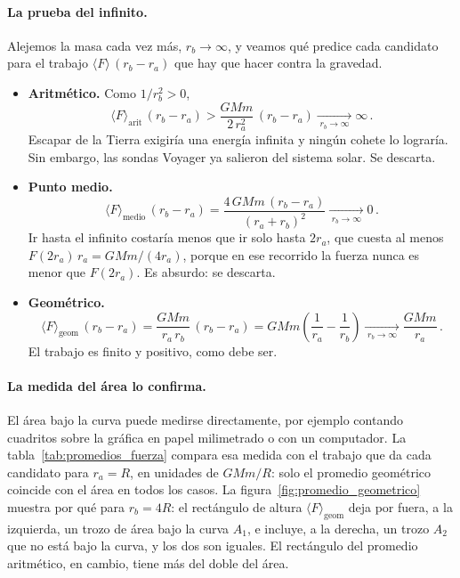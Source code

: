 \documentclass[11pt,a4paper]{book}
\begin{document}
\paragraph{La prueba del infinito.}
Alejemos la masa cada vez más, $r_{b} \to \infty$, y veamos qué predice cada
candidato para el trabajo $\langle F\rangle\,(r_{b} - r_{a})$ que hay que
hacer contra la gravedad.
\begin{itemize}
  \item \textbf{Aritmético.} Como $1/r_{b}^{2} > 0$,
    \begin{equation*}
      \langle F\rangle_{\text{arit}}\,(r_{b} - r_{a})
      > \frac{GMm}{2\,r_{a}^{2}}\,(r_{b} - r_{a})
      \xrightarrow[\;r_{b}\to\infty\;]{} \infty \,.
    \end{equation*}
    Escapar de la Tierra exigiría una energía infinita y ningún cohete lo
    lograría. Sin embargo, las sondas Voyager ya salieron del sistema solar.
    Se descarta.
  \item \textbf{Punto medio.}
    \begin{equation*}
      \langle F\rangle_{\text{medio}}\,(r_{b} - r_{a})
      = \frac{4\,GMm\,(r_{b} - r_{a})}{(r_{a} + r_{b})^{2}}
      \xrightarrow[\;r_{b}\to\infty\;]{} 0 \,.
    \end{equation*}
    Ir hasta el infinito costaría menos que ir solo hasta $2r_{a}$, que cuesta
    al menos $F(2r_{a})\,r_{a} = GMm/(4r_{a})$, porque en ese recorrido la
    fuerza nunca es menor que $F(2r_{a})$. Es absurdo: se descarta.
  \item \textbf{Geométrico.}
    \begin{equation*}
      \langle F\rangle_{\text{geom}}\,(r_{b} - r_{a})
      = \frac{GMm}{r_{a}\,r_{b}}\,(r_{b} - r_{a})
      = GMm\left(\frac{1}{r_{a}} - \frac{1}{r_{b}}\right)
      \xrightarrow[\;r_{b}\to\infty\;]{} \frac{GMm}{r_{a}} \,.
    \end{equation*}
    El trabajo es finito y positivo, como debe ser.
\end{itemize}

\paragraph{La medida del área lo confirma.}
El área bajo la curva puede medirse directamente, por ejemplo contando
cuadritos sobre la gráfica en papel milimetrado o con un computador. La
tabla~\ref{tab:promedios_fuerza} compara esa medida con el trabajo que da cada
candidato para $r_{a} = R$, en unidades de $GMm/R$: solo el promedio
geométrico coincide con el área en todos los casos. La
figura~\ref{fig:promedio_geometrico} muestra por qué para $r_{b} = 4R$: el
rectángulo de altura $\langle F\rangle_{\text{geom}}$ deja por fuera, a la
izquierda, un trozo de área bajo la curva $A_{1}$, e incluye, a la derecha, un
trozo $A_{2}$ que no está bajo la curva, y los dos son iguales. El rectángulo
del promedio aritmético, en cambio, tiene más del doble del área.
\end{document}
